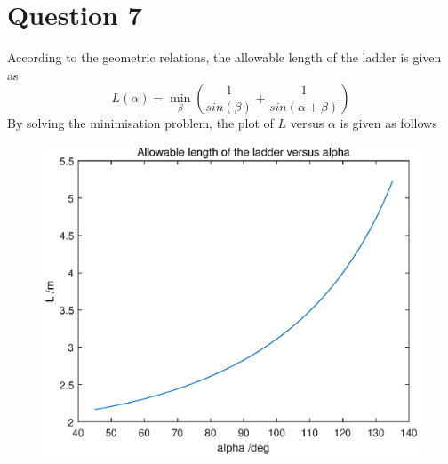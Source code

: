 \documentclass[paper=a4, fontsize=11pt]{scrartcl} %
\numberwithin{equation}{section} %
\numberwithin{figure}{section} %
\numberwithin{table}{section} %
\begin{document}
\section{Question 7}
	According to the geometric relations, the allowable length of the ladder is given as
	\begin{equation}
		L(\alpha) = \min\limits_{\beta} (\frac{1}{sin(\beta)} + \frac{1}{sin(\alpha + \beta)})
	\end{equation}
	By solving the minimisation problem, the plot of $L$ versus $\alpha$ is given as follows
	\begin{figure}[!htbp]
		\centering
		\includegraphics[width=15cm]{../pic/Task7.eps}	
	\end{figure}
\end{document}
